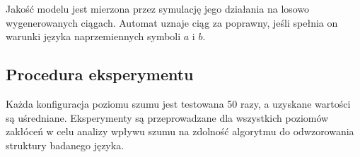 Jakość modelu jest mierzona przez symulację jego działania na losowo wygenerowanych ciągach. Automat uznaje ciąg za poprawny, jeśli spełnia on warunki języka naprzemiennych symboli \( a \) i \( b \).  

\subsection{Procedura eksperymentu}  
Każda konfiguracja poziomu szumu jest testowana 50 razy, a uzyskane wartości są uśredniane. Eksperymenty są przeprowadzane dla wszystkich poziomów zakłóceń w celu analizy wpływu szumu na zdolność algorytmu do odwzorowania struktury badanego języka.  


